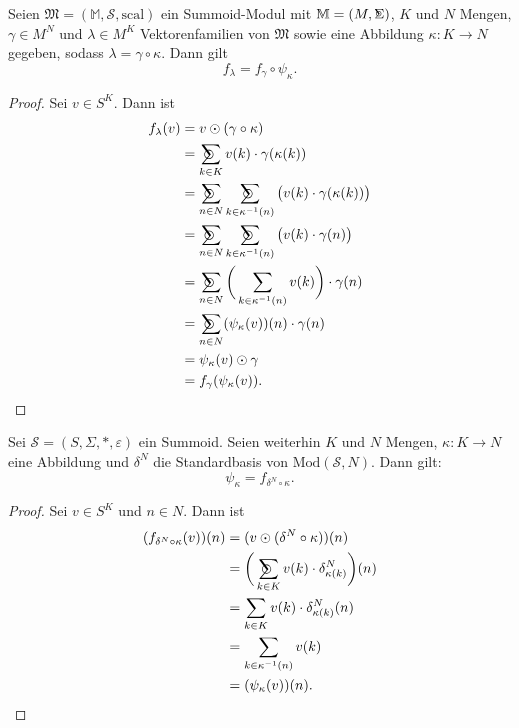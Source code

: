 \documentclass{article}
\DeclareMathOperator*{\Sigmacirc}{%
  \ThisStyle{\mathop{\ensurestackMath{\stackinset{c}{-0.75\LMpt}{c}{}{%
  \rotatebox[origin=lb]{-90}{$\circ$}}{\SavedStyle\Sigma}}}}}
\DeclareMathOperator*{\sumcirc}{%
  \ThisStyle{\mathop{\ensurestackMath{\stackinset{c}{-1.5\LMpt}{c}{}{%
  \rotatebox[origin=lb]{-90}{$\SavedStyle\scalerel*{\bm\Circle}{%
  i}$}}{\SavedStyle\sum}}}}}
\begin{document}
\begin{theorem}
  Seien $\mathfrak{M} = (\mathbb{M}, \mathcal{S}, \text{scal})$ ein Summoid-Modul
  mit $\mathbb{M} = (M, \Sigmacirc)$,
  $K$ und $N$ Mengen, $\gamma \in M^N$ und $\lambda \in M^K$
  Vektorenfamilien von $\mathfrak{M}$ sowie eine Abbildung $\kappa \colon K \to N$ gegeben,
  sodass $\lambda = \gamma \circ \kappa$.
  Dann gilt
  \begin{equation*}
    f_\lambda = f_\gamma \circ \psi_\kappa.
  \end{equation*} 
\end{theorem}
\begin{proof}
  Sei $v \in S^K$. Dann ist
  \begin{align*}
    f_\lambda(v)
    &= v \odot (\gamma \circ \kappa) \\
    &= \sumcirc_{k \in K}v(k) \cdot \gamma(\kappa(k)) \\
    &= \sumcirc_{n \in N}\sumcirc_{k \in \kappa^{-1}(n)} \big(v(k)\cdot \gamma(\kappa(k))\big) \\
    &= \sumcirc_{n \in N}\sumcirc_{k \in \kappa^{-1}(n)} \big(v(k)\cdot \gamma(n)\big) \\
    &= \sumcirc_{n \in N}\bigg(\sum_{k \in \kappa^{-1}(n)} v(k) \bigg) \cdot \gamma(n) \\
    &= \sumcirc_{n \in N}(\psi_\kappa(v))(n) \cdot \gamma(n) \\
    &=  \psi_\kappa(v) \odot \gamma \\
    &= f_\gamma(\psi_\kappa(v)).
  \end{align*}
\end{proof}

\begin{theorem}
  Sei $\mathcal{S} = (S, \Sigma, \ast, \varepsilon)$ ein Summoid.
  Seien weiterhin $K$ und $N$ Mengen, $\kappa \colon K \to N$ eine Abbildung
  und $\delta^N$ die Standardbasis von $\text{Mod}(\mathcal{S}, N)$.
  Dann gilt:
  \begin{equation*}
    \psi_\kappa = f_{\delta^N \circ \kappa}.
  \end{equation*}
\end{theorem}
\begin{proof}
  Sei $v \in S^K$ und $n \in N$. Dann ist
  \begin{align*}
    (f_{\delta^N \circ \kappa}(v))(n)
    &= (v \odot (\delta^N \circ \kappa))(n) \\
    &= \bigg(\sumcirc_{k \in K} v(k) \cdot \delta^N_{\kappa(k)}\bigg)(n) \\
    &= \sum_{k \in K} v(k) \cdot \delta^N_{\kappa(k)}(n) \\
    &= \sum_{k \in \kappa^{-1}(n)} v(k) \\
    &= (\psi_\kappa(v))(n).
  \end{align*}
\end{proof}
\end{document}
